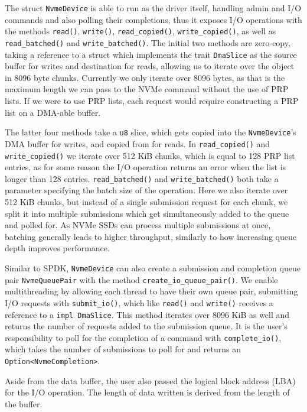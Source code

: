 The struct \texttt{NvmeDevice} is able to run as the driver itself, handling admin and I/O commands and also polling their completions, thus it exposes I/O operations with the methods \texttt{read()}, \texttt{write()},  \texttt{read\_copied()}, \texttt{write\_copied()}, as well as \texttt{read\_batched()} and \texttt{write\_batched()}. The initial two methods are zero-copy, taking a reference to a struct which implements the trait \texttt{DmaSlice} as the source buffer for writes and destination for reads, allowing us to iterate over the object in 8096 byte chunks. Currently we only iterate over 8096 bytes, as that is the maximum length we can pass to the NVMe command without the use of PRP lists. If we were to use PRP lists, each request would require constructing a PRP list on a DMA-able buffer.

The latter four methods take a \texttt{u8} slice, which gets copied into the \texttt{NvmeDevice}'s DMA buffer for writes, and copied from for reads. In \texttt{read\_copied()} and \texttt{write\_copied()} we iterate over 512 KiB chunks, which is equal to 128 PRP list entries, as for some reason the I/O operation returns an error when the list is longer than 128 entries. \texttt{read\_batched()} and \texttt{write\_batched()} both take a parameter specifying the batch size of the operation. Here we also iterate over 512 KiB chunks, but instead of a single submission request for each chunk, we split it into multiple submissions which get simultaneously added to the queue and polled for. As NVMe SSDs can process multiple submissions at once, batching generally leads to higher throughput, similarly to how increasing queue depth improves performance.

Similar to SPDK, \texttt{NvmeDevice} can also create a submission and completion queue pair \texttt{NvmeQueuePair} with the method \texttt{create\_io\_queue\_pair()}. We enable multithreading by allowing each thread to have their own queue pair, submitting I/O requests with \texttt{submit\_io()}, which like \texttt{read()} and \texttt{write()} receives a reference to a \texttt{impl DmaSlice}. This method iterates over 8096 KiB as well and returns the number of requests added to the submission queue. It is the user's responsibility to poll for the completion of a command with \texttt{complete\_io()}, which takes the number of submissions to poll for and returns an \texttt{Option<NvmeCompletion>}.

Aside from the data buffer, the user also passed the logical block address (LBA) for the I/O operation. The length of data written is derived from the length of the buffer.
